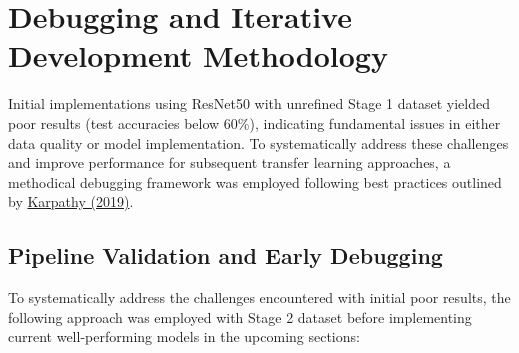 \documentclass[a4paper,12pt]{report}
\begin{document}




\section{Debugging and Iterative Development Methodology}

Initial implementations using ResNet50 with unrefined Stage 1 dataset yielded poor results (test accuracies below 60\%), indicating fundamental issues in either data quality or model implementation. To systematically address these challenges and improve performance for subsequent transfer learning approaches, a methodical debugging framework was employed following best practices outlined by \href{https://karpathy.github.io/2019/04/25/recipe/}{Karpathy (2019)}.

\subsection{Pipeline Validation and Early Debugging}

To systematically address the challenges encountered with initial poor results, the following approach was employed with Stage 2 dataset before implementing current well-performing models in the upcoming sections:
\end{document}

